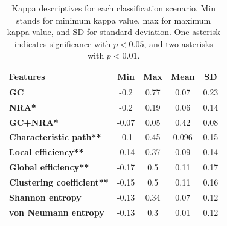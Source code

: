 \begin{table}[ht]
\caption{Kappa descriptives for each classification scenario. Min stands for minimum kappa value, max for maximum kappa value, and SD for standard deviation. One asterisk indicates significance with $p<0.05$, and two asterisks with $p<0.01$.}\label{Table1}
\centering %
{\begin{tabular}{|l|c|c|c|c|}
\hline
\toprule
 \textbf{Features} & \textbf{Min} & \textbf{Max} & \textbf{Mean} & \textbf{SD}\\
\hline
\toprule
\textbf{GC} & -0.2 & 0.77 & 0.07 & 0.23\\
\hline
\toprule
 \textbf{NRA*} & -0.2 & 0.19 & 0.06 & 0.14\\
\hline
\toprule
\textbf{GC+NRA*} & -0.07 & 0.05 & 0.42 & 0.08\\
\hline
\toprule
\textbf{Characteristic path**} & -0.1 & 0.45 & 0.096 & 0.15\\
\hline
\toprule
\textbf{Local efficiency**} & -0.14 & 0.37 & 0.09 & 0.14\\
\hline
\toprule
\textbf{Global efficiency**} & -0.17 & 0.5 & 0.11 & 0.17\\
\hline
\toprule
 \textbf{Clustering coefficient**} & -0.15 & 0.5 & 0.11 & 0.16\\
\hline
\toprule
\textbf{Shannon entropy} & -0.13 & 0.34 & 0.07 & 0.12\\
\hline
\toprule
\textbf{von Neumann entropy} & -0.13 & 0.3 & 0.01 & 0.12\\
\bottomrule
\end{tabular}}
\end{table}

